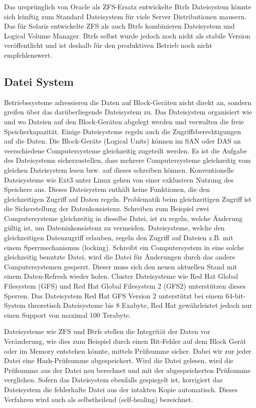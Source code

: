 Das ursprünglich von Oracle als ZFS-Ersatz entwickelte Btrfs Dateisystem könnte sich künftig zum Standard Dateisystem für viele Server Distributionen mausern. Das für Solaris entwickelte ZFS als auch Btrfs kombinieren Dateisystem und Logical Volume Manager. Btrfs selbst wurde jedoch noch nicht als stabile Version veröffentlicht und ist deshalb für den produktiven Betrieb noch nicht empfehlenswert.\cite{Redler2011}


\subsection{Datei System}
Betriebssysteme adressieren die Daten auf Block-Geräten nicht direkt an, sondern greifen über das darüberliegende Dateisystem zu. Das Dateisystem organisiert wie und wo Dateien auf den Block-Geräten abgelegt werden und verwalten die freie Speicherkapazität. Einige Dateisysteme regeln auch die Zugriffsberechtigungen auf die Daten. Die Block-Geräte (Logical Units) können im SAN oder DAS an veerschiedene Computersysteme gleichzeitig zugeteilt werden. Es ist die Aufgabe des Dateisystems sicherzustellen, dass mehrere Computersysteme gleichzeitig vom gleichen Dateisystem lesen bzw. auf dieses schreiben können. Konventionelle Dateisysteme wie Ext3 unter Linux gehen von einer exklusiven Nutzung des Speichers aus. Dieses Dateisystem enthält keine Funktionen, die den gleichzeitigen Zugriff auf Daten regeln. Problematik beim gleichzeitigen Zugriff ist die Sicherstellung der Datenkonsistenz. Schreiben zum Beispiel zwei Computersysteme gleichzeitig in dieselbe Datei, ist zu regeln, welche Änderung gültig ist, um Dateninkonsistenz zu vermeiden. Dateisysteme, welche den gleichzeitigen Datenzugriff erlauben, regeln den Zugriff auf Dateien z.B. mit einem Sperrmechanismus (locking). Schreibt ein Computersystem in eine solche gleichzeitig benutzte Datei, wird die Datei für Änderungen durch das andere Computersystemen gesperrt. Dieser muss sich den neuen aktuellen Stand mit einem Daten-Refresh wieder holen. Cluster Dateisysteme wie Red Hat Global Filesystem (GFS) und Red Hat Global Filesystem 2 (GFS2) unterstützen dieses Sperren. Das Dateisystem Red Hat GFS Version 2 unterstützt bei einem 64-bit-System theoretisch Dateisysteme bis 8 Exabyte, Red Hat gewährleistet jedoch nur einen Support von maximal 100 Terabyte.\cite{Levine2011}

Dateisysteme wie ZFS und Btrfs stellen die Integrität der Daten vor Veränderung, wie dies zum Beispiel durch einen Bit-Fehler auf dem Block Gerät oder im Memory entstehen könnte, mittels Prüfsumme sicher. Dabei wir zur jeder Datei eine Hash-Prüfsumme abgespeichert. Wird die Datei gelesen, wird die Prüfsumme aus der Datei neu berechnet und mit der abgespeicherten Prüfsumme verglichen. Sofern das Dateisystem ebenfalls gespiegelt ist, korrigiert das Dateisystem die fehlerhafte Datei aus der intakten Kopie automatisch. Dieses Verfahren wird auch als selbstheilend (self-healing) bezeichnet. \cite{Bonwick2005}\cite{Oracle}

